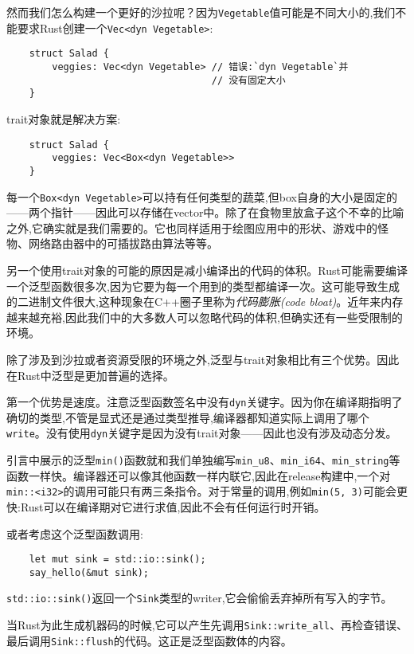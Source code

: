 然而我们怎么构建一个更好的沙拉呢？因为\texttt{Vegetable}值可能是不同大小的,我们不能要求Rust创建一个\texttt{Vec<dyn Vegetable>}:
\begin{verbatim}
    struct Salad {
        veggies: Vec<dyn Vegetable> // 错误:`dyn Vegetable`并
                                    // 没有固定大小
    }
\end{verbatim}

trait对象就是解决方案:
\begin{verbatim}
    struct Salad {
        veggies: Vec<Box<dyn Vegetable>>
    }
\end{verbatim}

每一个\texttt{Box<dyn Vegetable>}可以持有任何类型的蔬菜,但box自身的大小是固定的——两个指针——因此可以存储在vector中。除了在食物里放盒子这个不幸的比喻之外,它确实就是我们需要的。它也同样适用于绘图应用中的形状、游戏中的怪物、网络路由器中的可插拔路由算法等等。

另一个使用trait对象的可能的原因是减小编译出的代码的体积。Rust可能需要编译一个泛型函数很多次,因为它要为每一个用到的类型都编译一次。这可能导致生成的二进制文件很大,这种现象在C++圈子里称为\emph{代码膨胀(code bloat)}。近年来内存越来越充裕,因此我们中的大多数人可以忽略代码的体积,但确实还有一些受限制的环境。

除了涉及到沙拉或者资源受限的环境之外,泛型与trait对象相比有三个优势。因此在Rust中泛型是更加普遍的选择。

第一个优势是速度。注意泛型函数签名中没有\texttt{dyn}关键字。因为你在编译期指明了确切的类型,不管是显式还是通过类型推导,编译器都知道实际上调用了哪个\texttt{write}。没有使用\texttt{dyn}关键字是因为没有trait对象——因此也没有涉及动态分发。

引言中展示的泛型\texttt{min()}函数就和我们单独编写\texttt{min\_u8}、\texttt{min\_i64}、\texttt{min\_string}等函数一样快。编译器还可以像其他函数一样内联它,因此在release构建中,一个对\texttt{min::<i32>}的调用可能只有两三条指令。对于常量的调用,例如\texttt{min(5, 3)}可能会更快:Rust可以在编译期对它进行求值,因此不会有任何运行时开销。

或者考虑这个泛型函数调用:
\begin{verbatim}
    let mut sink = std::io::sink();
    say_hello(&mut sink);
\end{verbatim}

\texttt{std::io::sink()}返回一个\texttt{Sink}类型的writer,它会偷偷丢弃掉所有写入的字节。

当Rust为此生成机器码的时候,它可以产生先调用\texttt{Sink::write\_all}、再检查错误、最后调用\texttt{Sink::flush}的代码。这正是泛型函数体的内容。

